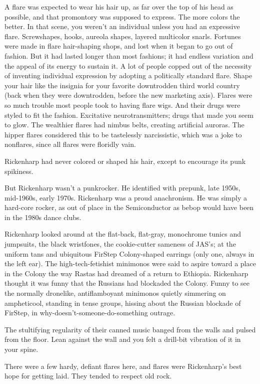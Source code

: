 A flare was expected to wear his hair up, as far over the top of his head as possible, and that promontory was supposed to express. The more colors the better. In that scene, you weren't an individual unless you had an expressive flare. Screwshapes, hooks, aureola shapes, layered multicolor snarls. Fortunes were made in flare hair-shaping shops, and lost when it began to go out of fashion. But it had lasted longer than most fashions; it had endless variation and the appeal of its energy to sustain it. A lot of people copped out of the necessity of inventing individual expression by adopting a politically standard flare. Shape your hair like the insignia for your favorite downtrodden third world country (back when they were downtrodden, before the new marketing axis). Flares were so much trouble most people took to having flare wigs. And their drugs were styled to fit the fashion. Excitative neurotransmitters; drugs that made you seem to glow. The wealthier flares had nimbus belts, creating artificial auroras. The hipper flares considered this to be tastelessly narcissistic, which was a joke to nonflares, since all flares were floridly vain.

Rickenharp had never colored or shaped his hair, except to encourage its punk spikiness.

But Rickenharp wasn't a punkrocker. He identified with prepunk, late 1950s, mid-1960s, early 1970s. Rickenharp was a proud anachronism. He was simply a hard-core rocker, as out of place in the Semiconductor as bebop would have been in the 1980s dance clubs.

Rickenharp looked around at the flat-back, flat-gray, monochrome tunics and jumpsuits, the black wristfones, the cookie-cutter sameness of JAS's; at the uniform tans and ubiquitous FirStep Colony-shaped earrings (only one, always in the left ear). The high-tech-fetishist minimonos were said to aspire toward a place in the Colony the way Rastas had dreamed of a return to Ethiopia. Rickenharp thought it was funny that the Russians had blockaded the Colony. Funny to see the normally dronelike, antiflamboyant minimonos quietly simmering on ampheticool, standing in tense groups, hissing about the Russian blockade of FirStep, in why-doesn't-someone-do-something outrage.

The stultifying regularity of their canned music banged from the walls and pulsed from the floor. Lean against the wall and you felt a drill-bit vibration of it in your spine.

There were a few hardy, defiant flares here, and flares were Rickenharp's best hope for getting laid. They tended to respect old rock.

